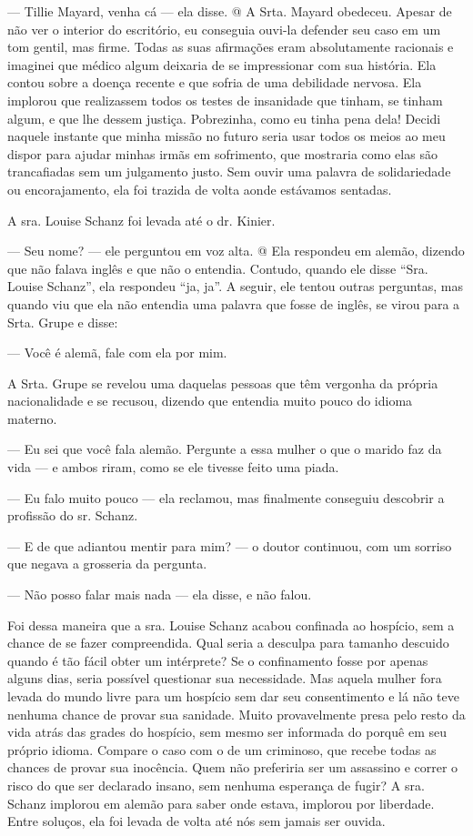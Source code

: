 ---
Tillie Mayard, venha cá --- ela disse. @ A Srta. Mayard obedeceu. Apesar
de não ver o interior do escritório, eu conseguia ouvi-la defender seu
caso em um tom gentil, mas firme. Todas as suas afirmações eram
absolutamente racionais e imaginei que médico algum deixaria de se
impressionar com sua história. Ela contou sobre a doença recente e que
sofria de uma debilidade nervosa. Ela implorou que realizassem todos os
testes de insanidade que tinham, se tinham algum, e que lhe dessem
justiça. Pobrezinha, como eu tinha pena dela! Decidi naquele instante
que minha missão no futuro seria usar todos os meios ao meu dispor para
ajudar minhas irmãs em sofrimento, que mostraria como elas são
trancafiadas sem um julgamento justo. Sem ouvir uma palavra de
solidariedade ou encorajamento, ela foi trazida de volta aonde estávamos
sentadas.

A sra. Louise Schanz foi levada até o dr. Kinier.

--- Seu nome? --- ele perguntou em voz alta. @ Ela respondeu em alemão,
dizendo que não falava inglês e que não o entendia. Contudo, quando ele
disse ``Sra. Louise Schanz'', ela respondeu ``ja, ja''. A seguir, ele
tentou outras perguntas, mas quando viu que ela não entendia uma palavra
que fosse de inglês, se virou para a Srta. Grupe e disse:

--- Você é alemã, fale com ela por mim.

A Srta. Grupe se revelou uma daquelas pessoas que têm vergonha da
própria nacionalidade e se recusou, dizendo que entendia muito pouco do
idioma materno.

--- Eu sei que você fala alemão. Pergunte a essa mulher o que o marido
faz da vida --- e ambos riram, como se ele tivesse feito uma piada.

--- Eu falo muito pouco --- ela reclamou, mas finalmente conseguiu
descobrir a profissão do sr. Schanz.

--- E de que adiantou mentir para mim? --- o doutor continuou, com um
sorriso que negava a grosseria da pergunta.

--- Não posso falar mais nada --- ela disse, e não falou.

Foi dessa maneira que a sra. Louise Schanz acabou confinada ao hospício,
sem a chance de se fazer compreendida. Qual seria a desculpa para
tamanho descuido quando é tão fácil obter um intérprete? Se o
confinamento fosse por apenas alguns dias, seria possível questionar sua
necessidade. Mas aquela mulher fora levada do mundo livre para um
hospício sem dar seu consentimento e lá não teve nenhuma chance de
provar sua sanidade. Muito provavelmente presa pelo resto da vida atrás
das grades do hospício, sem mesmo ser informada do porquê em seu próprio
idioma. Compare o caso com o de um criminoso, que recebe todas as
chances de provar sua inocência. Quem não preferiria ser um assassino e
correr o risco do que ser declarado insano, sem nenhuma esperança de
fugir? A sra. Schanz implorou em alemão para saber onde estava, implorou
por liberdade. Entre soluços, ela foi levada de volta até nós sem jamais
ser ouvida.

